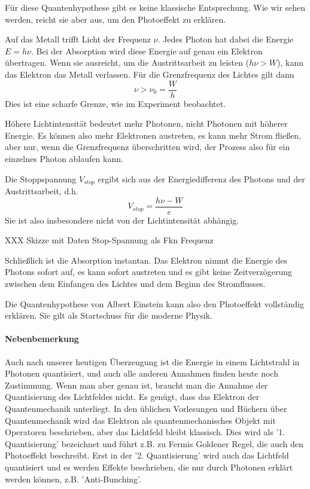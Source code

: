 Für diese Quantenhypothese gibt es keine klassische Entsprechung. Wie wir sehen werden, reicht sie aber aus, um den Photoeffekt zu erklären.

Auf das Metall trifft Licht der Frequenz $\nu$. Jedes Photon hat dabei die Energie $E = h \nu$. Bei der Absorption wird diese Energie auf genau ein Elektron übertragen. Wenn sie ausreicht, um die Austrittsarbeit zu leisten ($h \nu > W$), kann das Elektron das Metall verlassen. Für die Grenzfrequenz des Lichtes gilt dann
 \begin{equation}
     \nu > \nu_0 = \frac{W}{h}
 \end{equation}
 Dies ist eine scharfe Grenze, wie im Experiment beobachtet.

 Höhere Lichtintensität bedeutet mehr Photonen, nicht Photonen mit höherer Energie. Es können also mehr Elektronen austreten, es kann mehr Strom fließen, aber nur, wenn die Grenzfrequenz überschritten wird, der Prozess also für ein einzelnes Photon ablaufen kann.

 Die Stoppspannung $V_{stop}$ ergibt sich aus der Energiedifferenz des Photons und der Austrittsarbeit, d.h. 
 \begin{equation}
     V_{stop} = \frac{h \nu - W}{e}
 \end{equation}
 Sie ist also insbesondere nicht von der Lichtintensität abhängig.

 \begin{marginfigure}
    \caption{XXX Skizze mit Daten Stop-Spannung als Fkn Frequenz}
   \end{marginfigure}


 Schließlich ist die Absorption instantan. Das Elektron nimmt die Energie des Photons sofort auf, es kann sofort austreten und es gibt keine Zeitverzögerung zwischen dem Einfangen des Lichtes und dem Beginn des Stromflusses.

 Die Quantenhypothese von Albert Einstein kann also den Photoeffekt vollständig erklären. Sie gilt als Startschuss für die moderne Physik.

 \paragraph*{Nebenbemerkung} Auch nach unserer heutigen Überzeugung ist die Energie in einem Lichtstrahl in Photonen quantisiert, und auch alle anderen Annahmen finden heute noch Zustimmung. Wenn man aber genau ist, braucht man die Annahme der Quantisierung des Lichtfeldes nicht. Es genügt, dass das Elektron der Quantenmechanik unterliegt. In den üblichen Vorlesungen und Büchern über Quantenmechanik wird das Elektron als quantenmechanisches Objekt mit Operatoren beschrieben, aber das Lichtfeld bleibt klassisch. Dies wird als '1. Quantisierung' bezeichnet und führt z.B. zu Fermis Goldener Regel, die auch den Photoeffekt beschreibt.
 Erst in der '2. Quantisierung' wird auch das Lichtfeld quantisiert und es werden Effekte beschrieben, die nur durch Photonen erklärt werden können, z.B. 'Anti-Bunching'.


